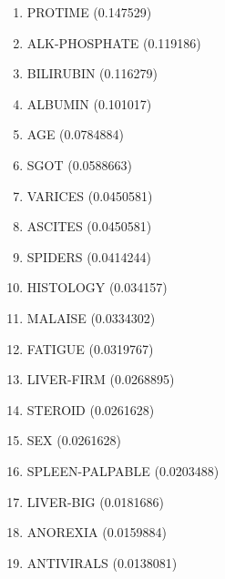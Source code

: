 \begin{enumerate}
\item PROTIME (0.147529)
\item ALK-PHOSPHATE (0.119186)
\item BILIRUBIN (0.116279)
\item ALBUMIN (0.101017)
\item AGE (0.0784884)
\item SGOT (0.0588663)
\item VARICES (0.0450581)
\item ASCITES (0.0450581)
\item SPIDERS (0.0414244)
\item HISTOLOGY (0.034157)
\item MALAISE (0.0334302)
\item FATIGUE (0.0319767)
\item LIVER-FIRM (0.0268895)
\item STEROID (0.0261628)
\item SEX (0.0261628)
\item SPLEEN-PALPABLE (0.0203488)
\item LIVER-BIG (0.0181686)
\item ANOREXIA (0.0159884)
\item ANTIVIRALS (0.0138081)
\end{enumerate}